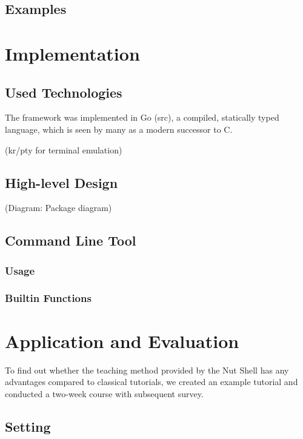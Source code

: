\documentclass[twoside]{scrreprt}
\begin{document}
\section{Examples}

\chapter{Implementation}

\section{Used Technologies}

The framework was implemented in Go (src), a compiled, statically typed language, which is seen by many as a modern successor to C.

(kr/pty for terminal emulation)

\section{High-level Design}

(Diagram: Package diagram)

\section{Command Line Tool}

\subsection{Usage}

\subsection{Builtin Functions}

\chapter{Application and Evaluation}

To find out whether the teaching method provided by the Nut Shell has any advantages compared to classical tutorials, we created an example tutorial and conducted a two-week course with subsequent survey.

\section{Setting}
\end{document}
